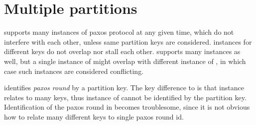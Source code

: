 
\section{Multiple partitions}\label{sec:mpp:requirements}


\lwt supports many instances of paxos protocol at any given time, which do not interfere with each other, unless same partition keys are considered. \lwt instances for different keys do not overlap nor stall each other.
\mpt supports many instances as well, but a single instance of \mpt might overlap with different instance of \mpt, in which case such instances are considered conflicting. 

\lwt identifies \emph{paxos round} by a partition key. The key difference to \lwt is that \mpt instance relates to many keys, thus instance of \mpt cannot be identified by the partition key. Identification of the paxos round in \mpt becomes troublesome, since it is not obvious how to relate many different keys to single paxos round id. \label{sec:mpp:requirements:identifyRound}







